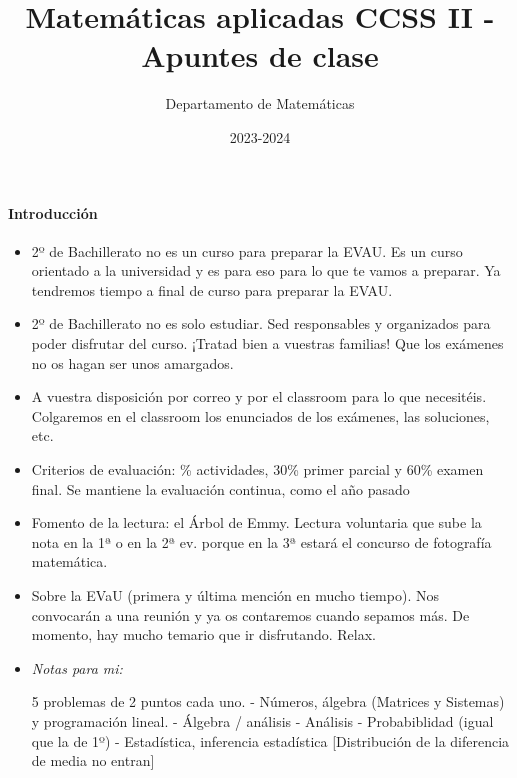 \documentclass[nobuilddate]{Docencia}
\title{Matemáticas aplicadas CCSS II - Apuntes de clase}
\author{Departamento de Matemáticas}
\date{2023-2024}
\begin{document}
\pagestyle{plain}
\maketitle
\tableofcontents
\newpage

\newcommand{\hide}[1]{#1}

\renewcommand{\vec}[1]{\overrightarrow{#1}}

\paragraph{Introducción}

\begin{itemize}
    \item 2º de Bachillerato no es un curso para preparar la EVAU. Es un curso orientado a la universidad y es para eso para lo que te vamos a preparar. 
    Ya tendremos tiempo a final de curso para preparar la EVAU.
    
    \item 2º de Bachillerato no es solo estudiar. Sed responsables y organizados para poder disfrutar del curso. ¡Tratad bien a vuestras familias! Que los exámenes no os hagan ser unos amargados.
    
    \item A vuestra disposición por correo y por el classroom para lo que necesitéis. Colgaremos en el classroom los enunciados de los exámenes, las soluciones, etc.
    
    \item Criterios de evaluación: 
    \% actividades, 30\% primer parcial y 60\% examen final. 
    \subitem Se mantiene la evaluación continua, como el año pasado
    \item Fomento de la lectura: el Árbol de Emmy. Lectura voluntaria que sube la nota en la 1ª o en la 2ª ev. porque en la 3ª estará el concurso de fotografía matemática.


    \item Sobre la EVaU (primera y última mención en mucho tiempo). Nos convocarán a una reunión y ya os contaremos cuando sepamos más. De momento, hay mucho temario que ir disfrutando. Relax.

\item \textit{Notas para mi:}

5 problemas de 2 puntos cada uno.
-  Números, álgebra (Matrices y Sistemas) y programación lineal.
-  Álgebra / análisis
-  Análisis
-  Probabiblidad (igual que la de 1º)
-  Estadística, inferencia estadística [Distribución de la diferencia de media no entran]

\end{itemize}



%
%


\newpage
\printindex
\listoffigures
\listoftables
\end{document}
